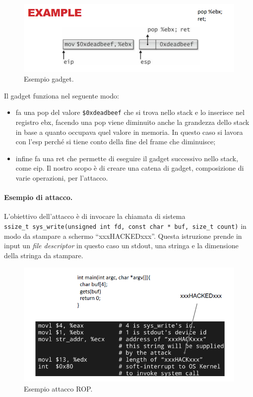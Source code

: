 \begin{figure}[H]
    \centering
    \includegraphics[width=13cm, keepaspectratio]{capitoli/secure_coding/img/cap_3/es_gadget.png}
    \caption{Esempio gadget.}\label{fig:es_gadget}
\end{figure}

Il gadget funziona nel seguente modo:

\begin{itemize}
    \item fa una pop del valore \verb|$0xdeadbeef| che si trova nello stack e lo
          inserisce nel registro ebx, facendo una pop viene diminuito anche la grandezza
          dello stack in base a quanto occupava quel valore in memoria. In questo caso si
          lavora con l'esp perché si tiene conto della fine del frame che diminuisce;
    \item infine fa una ret che permette di eseguire il gadget successivo nello stack,
          come eip. Il nostro scopo è di creare una catena di gadget, composizione di varie
          operazioni, per l'attacco.
\end{itemize}

\paragraph{Esempio di attacco.}
L'obiettivo dell'attacco è di invocare la chiamata di sistema \\
\verb|ssize_t sys_write(unsigned int fd, const char * buf, size_t count)|
in modo da stampare a schermo “xxxHACKEDxxx”. Questa istruzione prende in input
un \textit{file descriptor} in questo caso un stdout, una stringa e la dimensione
della stringa da stampare.

\begin{figure}[H]
    \centering
    \includegraphics[width=13cm, keepaspectratio]{capitoli/secure_coding/img/cap_3/es_attacco_rop.png}
    \caption{Esempio attacco ROP.}\label{fig:es_attacco_rop}
\end{figure}

